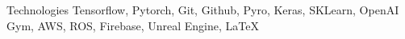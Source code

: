 \cvskill
  {Technologies}
    {Tensorflow, Pytorch, Git, Github, Pyro, Keras, SKLearn, OpenAI Gym, AWS, ROS, Firebase, Unreal Engine, LaTeX}